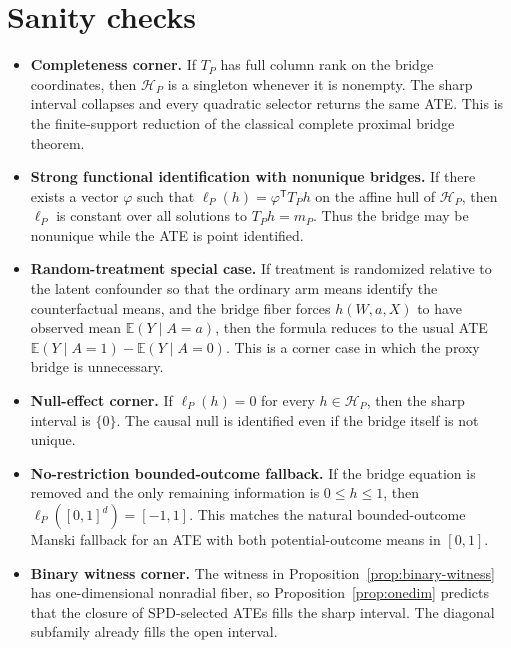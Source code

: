 \documentclass[11pt]{article}
\newcommand{\E}{\mathbb{E}}
\newcommand{\transpose}{\mathsf{T}}
\newcommand{\calH}{\mathcal{H}}
\theoremstyle{definition}
\theoremstyle{plain}
\theoremstyle{remark}
\begin{document}
\section{Sanity checks}
\begin{itemize}[leftmargin=*]
\item \textbf{Completeness corner.}  If \(T_P\) has full column rank on the
bridge coordinates, then \(\calH_P\) is a singleton whenever it is nonempty.
The sharp interval collapses and every quadratic selector returns the same
ATE.  This is the finite-support reduction of the classical complete
proximal bridge theorem.

\item \textbf{Strong functional identification with nonunique bridges.}  If
there exists a vector \(\varphi\) such that
\(\ell_P(h)=\varphi^\transpose T_Ph\) on the affine hull of \(\calH_P\),
then \(\ell_P\) is constant over all solutions to \(T_Ph=m_P\).  Thus the
bridge may be nonunique while the ATE is point identified.

\item \textbf{Random-treatment special case.}  If treatment is randomized
relative to the latent confounder so that the ordinary arm means identify the
counterfactual means, and the bridge fiber forces
\(h(W,a,X)\) to have observed mean \(\E(Y\mid A=a)\), then the formula
reduces to the usual ATE
\(\E(Y\mid A=1)-\E(Y\mid A=0)\).  This is a corner case in which the proxy
bridge is unnecessary.

\item \textbf{Null-effect corner.}  If \(\ell_P(h)=0\) for every
\(h\in\calH_P\), then the sharp interval is \(\{0\}\).  The causal null is
identified even if the bridge itself is not unique.

\item \textbf{No-restriction bounded-outcome fallback.}  If the bridge
equation is removed and the only remaining information is \(0\le h\le1\),
then \(\ell_P([0,1]^d)=[-1,1]\).  This matches the natural bounded-outcome
Manski fallback for an ATE with both potential-outcome means in \([0,1]\).

\item \textbf{Binary witness corner.}  The witness in
Proposition~\ref{prop:binary-witness} has one-dimensional nonradial fiber,
so Proposition~\ref{prop:onedim} predicts that the closure of SPD-selected
ATEs fills the sharp interval.  The diagonal subfamily already fills the
open interval.
\end{itemize}
\end{document}
